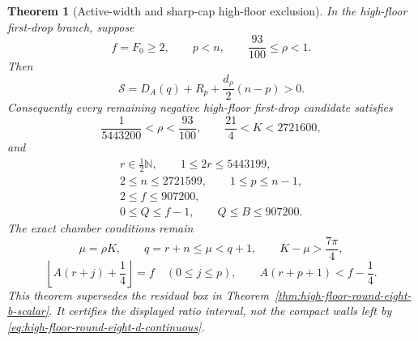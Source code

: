 \documentclass[11pt]{article}
\newtheorem{theorem}{Theorem}[section]
\theoremstyle{remark}
\newcommand{\N}{\mathbb N}
\begin{document}
\begin{theorem}[Active-width and sharp-cap high-floor exclusion]
\label{thm:high-floor-round-eight-d-scalar}
In the high-floor first-drop branch, suppose
\[
 f=F_0\geq2,\qquad p<n,\qquad
 \frac{93}{100}\leq\rho<1.
\]
Then
\begin{equation}
 \boxed{
 \mathcal S=D_A(q)+R_p+\frac{d_\rho}{2}(n-p)>0.}
 \label{eq:high-floor-round-eight-d-positive}
\end{equation}
Consequently every remaining negative high-floor first-drop candidate
satisfies
\begin{equation}
 \boxed{
 \frac1{5443200}<\rho<\frac{93}{100},\qquad
 \frac{21}{4}<K<2721600,}
 \label{eq:high-floor-round-eight-d-continuous}
\end{equation}
and
\begin{equation}
 \boxed{
 \begin{gathered}
 r\in\tfrac12\N,\qquad 1\leq2r\leq5443199,\\
 2\leq n\leq2721599,\qquad 1\leq p\leq n-1,\\
 2\leq f\leq907200,\\
 0\leq Q\leq f-1,\qquad Q\leq B\leq907200.
 \end{gathered}}
 \label{eq:high-floor-round-eight-d-discrete}
\end{equation}
The exact chamber conditions remain
\begin{equation}
 \mu=\rho K,\qquad q=r+n\leq\mu<q+1,\qquad
 K-\mu>\frac{7\pi}{4},
 \label{eq:high-floor-round-eight-d-chamber-one}
\end{equation}
\begin{equation}
 \left\lfloor A(r+j)+\frac14\right\rfloor=f
 \quad(0\leq j\leq p),\qquad
 A(r+p+1)<f-\frac14.
 \label{eq:high-floor-round-eight-d-chamber-two}
\end{equation}
This theorem supersedes the residual box in
Theorem~\ref{thm:high-floor-round-eight-b-scalar}.  It certifies the
displayed ratio interval, not the compact walls left by
\eqref{eq:high-floor-round-eight-d-continuous}.
\end{theorem}
\end{document}
